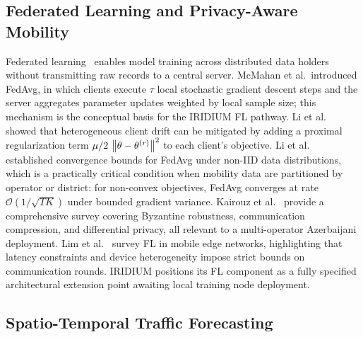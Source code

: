 
\subsection{Federated Learning and Privacy-Aware Mobility}

Federated learning~\cite{mcmahan2017fedavg} enables model training across
distributed data holders without transmitting raw records to a central server.
McMahan et al.\ introduced FedAvg, in which clients execute $\tau$ local
stochastic gradient descent steps and the server aggregates parameter
updates weighted by local sample size; this mechanism is the conceptual
basis for the IRIDIUM FL pathway.
Li et al.\ \cite{li2020fedprox} showed that heterogeneous client drift can
be mitigated by adding a proximal regularization term
$\mu/2\,\left\lVert\theta - \theta^{(r)}\right\rVert^2$ to each client's objective.
Li et al.\ \cite{li2020fedavg_convergence} established convergence bounds
for FedAvg under non-IID data distributions, which is a practically
critical condition when mobility data are partitioned by operator or
district: for non-convex objectives, FedAvg converges at rate
$\mathcal{O}(1/\sqrt{TK})$ under bounded gradient variance.
Kairouz et al.\ \cite{kairouz2021advances} provide a comprehensive survey
covering Byzantine robustness, communication compression, and differential
privacy, all relevant to a multi-operator Azerbaijani deployment.
Lim et al.\ \cite{lim2020federated_edge} survey FL in mobile edge networks,
highlighting that latency constraints and device heterogeneity impose strict
bounds on communication rounds.
IRIDIUM positions its FL component as a fully specified architectural
extension point awaiting local training node deployment.

\subsection{Spatio-Temporal Traffic Forecasting}

